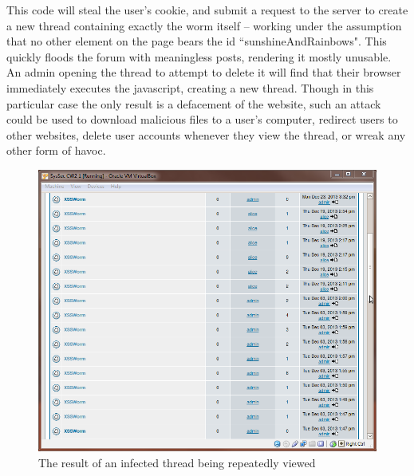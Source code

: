 This code will steal the user's cookie, and submit a request to the server to create a new thread containing exactly the
worm itself -- working under the assumption that no other element on the page bears the id ``sunshineAndRainbows". This
quickly floods the forum with meaningless posts, rendering it mostly unusable. An admin opening the thread to attempt to
delete it will find that their browser immediately executes the javascript, creating a new thread. Though in this
particular case the only result is a defacement of the website, such an attack could be used to download malicious files
to a user's computer, redirect users to other websites, delete user accounts whenever they view the thread, or wreak any
other form of havoc.

\begin{figure}[h]
    \centering
    \includegraphics[width=.8\linewidth]{images/xss_victory.png}
    \caption{The result of an infected thread being repeatedly viewed}
\end{figure}

